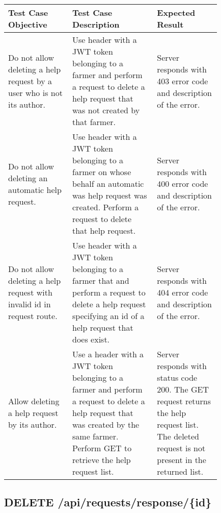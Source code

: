 \begin{longtable}{p{0.25\linewidth}p{0.33\linewidth}p{0.25\linewidth}}
	\toprule
	\textbf{Test Case Objective} & \textbf{Test Case Description} & \textbf{Expected Result}\\
	\midrule
	Do not allow deleting a help request by a user who is not its author. & Use header with a JWT token belonging to a farmer and perform a request to delete a help request that was not created by that farmer. & Server responds with 403 error code and description of the error.\\
	\midrule
	Do not allow deleting an automatic help request. & Use header with a JWT token belonging to a farmer on whose behalf an automatic was help request was created. Perform a request to delete that help request. & Server responds with 400 error code and description of the error.\\
	\midrule
	Do not allow deleting a help request with invalid id in request route. & Use header with a JWT token belonging to a farmer that and perform a request to delete a help request specifying an id of a help request that does exist. &  Server responds with 404 error code and description of the error.\\
	\midrule
	Allow deleting a help request by its author. & Use a header with a JWT token belonging to a farmer and perform a request to delete a help request that was created by the same farmer. Perform GET to retrieve the help request list. & Server responds with status code 200. The GET request returns the help request list. The deleted request is not present in the returned list.\\
	\bottomrule
\end{longtable}

\newpage
\subsection{DELETE \slash api\slash requests\slash response\slash\{id\}}


